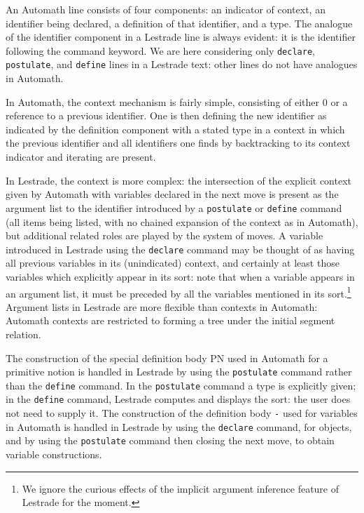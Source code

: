 \documentclass[12pt]{article}
\begin{document}
An Automath line consists of four components:  an indicator of context, an identifier being declared, a definition of that identifier, and a type.  The analogue of the identifier component in a Lestrade line is always evident:  it is the identifier following the command keyword.  We are here considering only {\tt declare}, {\tt postulate}, and {\tt define} lines in
a Lestrade text:  other lines do not have analogues in Automath.

In Automath, the context mechanism is fairly simple, consisting of either 0 or a reference to a previous identifier.  One is then defining the new identifier as
indicated by the definition component with a stated type in a context in which the previous identifier and all identifiers one finds by backtracking to its context indicator and iterating are present.

In Lestrade, the context is more complex:  the intersection of the explicit context given by Automath with variables declared in the next move  is present as the argument list to the identifier introduced by a  {\tt postulate} or {\tt define} command (all items being listed, with no chained expansion of the context as in Automath), but additional related roles are played by the system of moves.  A variable introduced in Lestrade using the {\tt declare}
command may be thought of as having all previous variables in its (unindicated) context, and certainly at least those variables which explicitly appear in its sort:  note that when a variable appears in an argument list, it must be preceded by all the variables mentioned in its sort.\footnote{We ignore the curious effects of the implicit argument inference feature of Lestrade for the  moment.}  Argument lists in Lestrade are more flexible than contexts in Automath:  Automath contexts are restricted to forming a tree under the initial segment relation.

The construction of the special definition body PN used in Automath for a primitive notion is handled in Lestrade by using the {\tt postulate} command rather than the {\tt define} command.  In the {\tt postulate} command a type is explicitly given; in the {\tt define} command, Lestrade computes and displays the sort:  the user does not need to supply it.  The construction of the definition body {\tt -}  used for variables in Automath is handled in Lestrade by using the {\tt declare} command, for objects, and by using the {\tt postulate} command then closing the next move, to obtain variable constructions.
\end{document}
